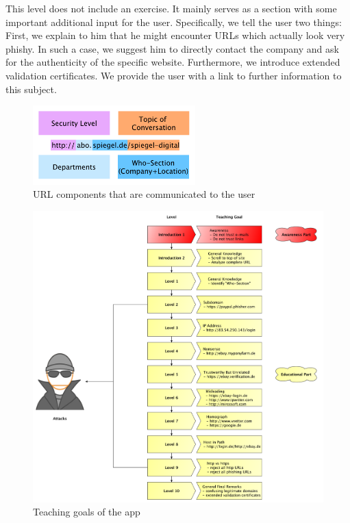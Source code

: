 \begin{description}[leftmargin=0cm]
	\item[Level 10] This level does not include an exercise.
 It mainly serves as a section with some important additional input for the user.
 Specifically, we tell the user two things: First, we explain to him that he might encounter URLs which actually look very phishy.
 In such a case, we suggest him to directly contact the company and ask for the authenticity of the specific website.
 Furthermore, we introduce extended validation certificates.
 We provide the user with a link to further information to this subject.

\end{description}

\begin{figure}[hHtbp]
\centering
\includegraphics[width=0.56\textwidth]{graphix/url_components.pdf}
\caption{URL components that are communicated to the user}
\label{fig:url_components}
\end{figure}

\begin{figure}[hHtbp]
\centering
\includegraphics[width=1.0\textwidth]{graphix/level_teaching_goals.pdf}
\caption{Teaching goals of the app}
\label{fig:url_components}
\end{figure}
